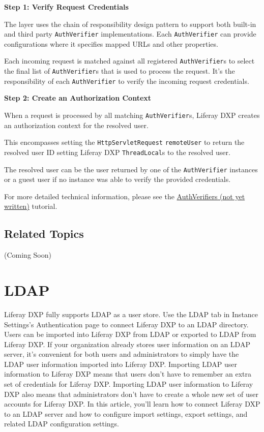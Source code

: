 \textbf{Step 1: Verify Request Credentials}

The layer uses the chain of responsibility design pattern to support
both built-in and third party \texttt{AuthVerifier} implementations.
Each \texttt{AuthVerifier} can provide configurations where it specifies
mapped URLs and other properties.

Each incoming request is matched against all registered
\texttt{AuthVerifier}s to select the final list of
\texttt{AuthVerifier}s that is used to process the request. It's the
responsibility of each \texttt{AuthVerifier} to verify the incoming
request credentials.

\textbf{Step 2: Create an Authorization Context}

When a request is processed by all matching \texttt{AuthVerifier}s,
Liferay DXP creates an authorization context for the resolved user.

This encompasses setting the \texttt{HttpServletRequest}
\texttt{remoteUser} to return the resolved user ID setting Liferay DXP
\texttt{ThreadLocal}s to the resolved user.

The resolved user can be the user returned by one of the
\texttt{AuthVerifier} instances or a guest user if no instance was able
to verify the provided credentials.

For more detailed technical information, please see the
\href{}{AuthVerifiers (not yet written)} tutorial.

\subsection{Related Topics}\label{related-topics-5}

(Coming Soon)

\section{LDAP}\label{ldap}

Liferay DXP fully supports LDAP as a user store. Use the LDAP tab in
Instance Settings's Authentication page to connect Liferay DXP to an
LDAP directory. Users can be imported into Liferay DXP from LDAP or
exported to LDAP from Liferay DXP. If your organization already stores
user information on an LDAP server, it's convenient for both users and
administrators to simply have the LDAP user information imported into
Liferay DXP. Importing LDAP user information to Liferay DXP means that
users don't have to remember an extra set of credentials for Liferay
DXP. Importing LDAP user information to Liferay DXP also means that
administrators don't have to create a whole new set of user accounts for
Liferay DXP. In this article, you'll learn how to connect Liferay DXP to
an LDAP server and how to configure import settings, export settings,
and related LDAP configuration settings.

